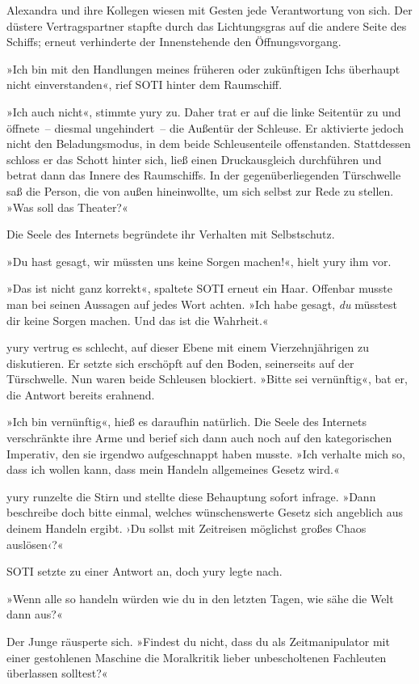 Alexandra und ihre Kollegen wiesen mit Gesten jede Verantwortung von sich. Der düstere Vertragspartner stapfte durch das Lichtungsgras auf die andere Seite des Schiffs; erneut verhinderte der Innenstehende den Öffnungsvorgang.

»Ich bin mit den Handlungen meines früheren oder zukünftigen Ichs überhaupt nicht einverstanden«, rief SOTI hinter dem Raumschiff.

»Ich auch nicht«, stimmte yury zu. Daher trat er auf die linke Seitentür zu und öffnete~– diesmal ungehindert~– die Außentür der Schleuse. Er aktivierte jedoch nicht den Beladungsmodus, in dem beide Schleusenteile offenstanden. Stattdessen schloss er das Schott hinter sich, ließ einen Druckausgleich durchführen und betrat dann das Innere des Raumschiffs. In der gegenüberliegenden Türschwelle saß die Person, die von außen hineinwollte, um sich selbst zur Rede zu stellen. »Was soll das Theater?«

Die Seele des Internets begründete ihr Verhalten mit Selbstschutz.

»Du hast gesagt, wir müssten uns keine Sorgen machen!«, hielt yury ihm vor.

»Das ist nicht ganz korrekt«, spaltete SOTI erneut ein Haar. Offenbar musste man bei seinen Aussagen auf jedes Wort achten. »Ich habe gesagt, \emph{du} müsstest dir keine Sorgen machen. Und das ist die Wahrheit.«

yury vertrug es schlecht, auf dieser Ebene mit einem Vierzehnjährigen zu diskutieren. Er setzte sich erschöpft auf den Boden, seinerseits auf der Türschwelle. Nun waren beide Schleusen blockiert. »Bitte sei vernünftig«, bat er, die Antwort bereits erahnend.

»Ich bin vernünftig«, hieß es daraufhin natürlich. Die Seele des Internets verschränkte ihre Arme und berief sich dann auch noch auf den kategorischen Imperativ, den sie irgendwo aufgeschnappt haben musste. »Ich verhalte mich so, dass ich wollen kann, dass mein Handeln allgemeines Gesetz wird.«

yury runzelte die Stirn und stellte diese Behauptung sofort infrage. »Dann beschreibe doch bitte einmal, welches wünschenswerte Gesetz sich angeblich aus deinem Handeln ergibt. ›Du sollst mit Zeitreisen möglichst großes Chaos auslösen‹?«

SOTI setzte zu einer Antwort an, doch yury legte nach.

»Wenn alle so handeln würden wie du in den letzten Tagen, wie sähe die Welt dann aus?«

Der Junge räusperte sich. »Findest du nicht, dass du als Zeitmanipulator mit einer gestohlenen Maschine die Moralkritik lieber unbescholtenen Fachleuten überlassen solltest?«


